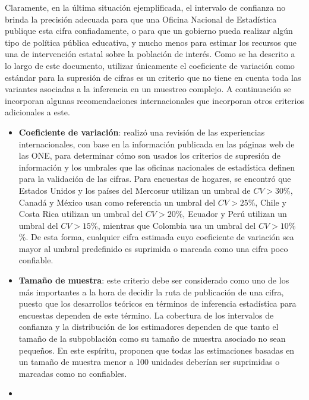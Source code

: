 \documentclass[
  10pt,
  spanish,
]{book}
\providecommand{\tightlist}{%
  \setlength{\itemsep}{0pt}\setlength{\parskip}{0pt}}
\begin{document}
Claramente, en la última situación ejemplificada, el intervalo de confianza no brinda la precisión adecuada para que una Oficina Nacional de Estadística publique esta cifra confiadamente, o para que un gobierno pueda realizar algún tipo de política pública educativa, y mucho menos para estimar los recursos que una de intervención estatal sobre la población de interés. Como se ha descrito a lo largo de este documento, utilizar únicamente el coeficiente de variación como estándar para la supresión de cifras es un criterio que no tiene en cuenta toda las variantes asociadas a la inferencia en un muestreo complejo. A continuación se incorporan algunas recomendaciones internacionales que incorporan otros criterios adicionales a este.

\begin{itemize}
\tightlist
\item
  \textbf{Coeficiente de variación}: \citet{CepalSAe2018} realizó una revisión de las experiencias internacionales, con base en la información publicada en las páginas web de las ONE, para determinar cómo son usados los criterios de supresión de información y los umbrales que las oficinas nacionales de estadística definen para la validación de las cifras. Para encuestas de hogares, se encontró que Estados Unidos y los países del Mercosur utilizan un umbral de \(CV > 30\%\), Canadá y México usan como referencia un umbral del \(CV > 25\%\), Chile y Costa Rica utilizan un umbral del \(CV > 20\%\), Ecuador y Perú utilizan un umbral del \(CV > 15\%\), mientras que Colombia usa un umbral del \(CV > 10\%\)\%. De esta forma, cualquier cifra estimada cuyo coeficiente de variación sea mayor al umbral predefinido es suprimida o marcada como una cifra poco confiable.
\item
  \textbf{Tamaño de muestra}: este criterio debe ser considerado como uno de los más importantes a la hora de decidir la ruta de publicación de una cifra, puesto que los desarrollos teóricos en términos de inferencia estadística para encuestas dependen de este término. La cobertura de los intervalos de confianza y la distribución de los estimadores dependen de que tanto el tamaño de la subpoblación como su tamaño de muestra asociado no sean pequeños. En este espíritu, \citet{Barnett_Walker_Chromy_Davis_Emrich_Odom_Packer_2003} proponen que todas las estimaciones basadas en un tamaño de muestra menor a 100 unidades deberían ser suprimidas o marcadas como no confiables.
\item

\end{itemize}
\end{document}
